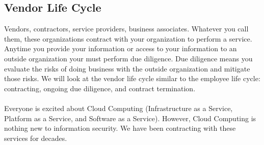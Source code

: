 \subsection{Vendor Life Cycle}
Vendors, contractors, service providers, business associates. Whatever you call them, these organizations contract with your organization to perform a service. Anytime you provide your information or access to your information to an outside organization your must perform due diligence. Due diligence means you evaluate the risks of doing business with the outside organization and mitigate those risks. We will look at the vendor life cycle similar to the employee life cycle: contracting, ongoing due diligence, and contract termination.\\\\
Everyone is excited about Cloud Computing (Infrastructure as a Service, Platform as a Service, and Software as a Service). However, Cloud Computing is nothing new to  information security. We have been contracting with these services for decades.
